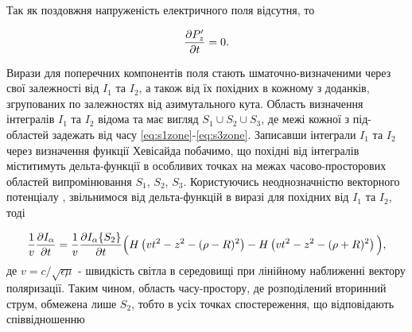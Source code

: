 %

Так як поздовжня напруженість електричного поля відсутня, то

\begin{equation*} \begin{aligned}
\frac{\partial P_z^\prime}{\partial t} = 0.
\end{aligned} \end{equation*}

Вирази для поперечних компонентів поля стають шматочно-визначеними
через свої залежності від $ I_1 $ та $ I_2 $, а також від їх похідних в 
кожному з доданків, згрупованих по залежностях від азимутального кута.
Область визначення інтегралів $ I_1 $ та $ I_2 $ відома та має вигляд 
$ S_1 \cup S_2 \cup S_3 $, де межі кожної з під-областей задежать від часу 
\eqref{eq:s1zone}-\eqref{eq:s3zone}. Записавши інтеграли $ I_1 $ та $ I_2 $ 
через визначення функції Хевісайда побачимо, що похідні від інтегралів 
міститимуть дельта-функції в особливих точках на межах часово-просторових 
областей випромінювання $ S_1 $, $ S_2 $, $ S_3 $. Користуючись неоднозначністю 
векторного потенціалу \cite[ст. 77]{imp:LandauII}, звільнимося від дельта-функцій 
в виразі для похідних від $ I_1 $ та $ I_2 $, тоді

\begin{equation*} \begin{aligned}
\frac{1}{v} \frac{\partial I_\alpha}{\partial t} = 
\frac{1}{v} \frac{\partial  I_\alpha \{ S_{2} \} }{\partial t} 
\Big( H \left( vt^2 - z^2 - (\rho - R)^2 \right)  - 
H \left( vt^2 - z^2 - (\rho + R)^2 \right) \Big),
\end{aligned} \end{equation*}
%
де $ v = c/\sqrt{\epsilon \mu} $ - швидкість світла в середовищі при 
лінійному наближенні вектору поляризації. Таким чином, область часу-простору,
де розподілений вторинний струм, обмежена лише $ S_2 $, тобто в усіх точках 
спостереження, що відповідають співвідношенню

